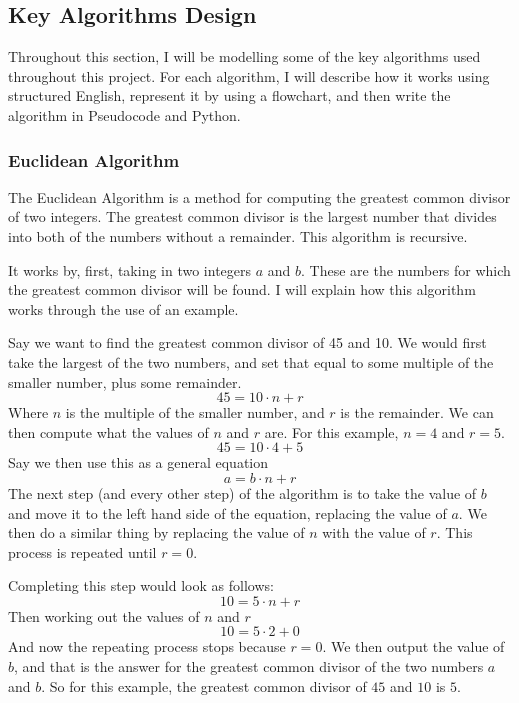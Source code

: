 \documentclass{article}
\begin{document}
\clearpage

\subsection{Key Algorithms Design}
Throughout this section, I will be modelling some of the key algorithms used throughout this project. For each algorithm, I will describe how it works using structured English, represent it by using a flowchart, and then write the algorithm in Pseudocode and Python.

\subsubsection{Euclidean Algorithm}
The Euclidean Algorithm is a method for computing the greatest common divisor of two integers. The greatest common divisor is the largest number that divides into both of the numbers without a remainder. This algorithm is recursive.

It works by, first, taking in two integers $a$ and $b$. These are the numbers for which the greatest common divisor will be found. I will explain how this algorithm works through the use of an example.

Say we want to find the greatest common divisor of 45 and 10.
We would first take the largest of the two numbers, and set that equal to some multiple of the smaller number, plus some remainder.
$$45 = 10 \cdot n + r$$
Where $n$ is the multiple of the smaller number, and $r$ is the remainder.
We can then compute what the values of $n$ and $r$ are. For this example, $n = 4$ and $r = 5$.
$$45 = 10 \cdot 4 + 5$$
Say we then use this as a general equation
$$a = b \cdot n + r$$
The next step (and every other step) of the algorithm is to take the value of $b$ and move it to the left hand side of the equation, replacing the value of $a$. We then do a similar thing by replacing the value of $n$ with the value of $r$. This process is repeated until $r = 0$.

Completing this step would look as follows:
$$10 = 5 \cdot n + r$$
Then working out the values of $n$ and $r$
$$10 = 5 \cdot 2 + 0$$
And now the repeating process stops because $r=0$. We then output the value of $b$, and that is the answer for the greatest common divisor of the two numbers $a$ and $b$. So for this example, the greatest common divisor of $45$ and $10$ is $5$.
\end{document}
